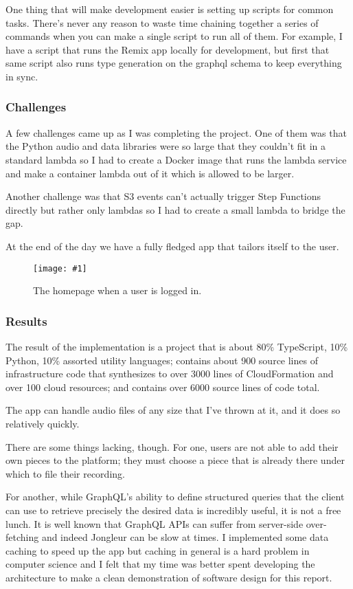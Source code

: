 \documentclass{article}
\newcommand{\screenshot}[2]{
  \begin{figure}[h]
    \texttt{[image: \#1]}
    \caption*{#2}
  \end{figure}
}
\begin{document}
One thing that will make development easier is setting up scripts for common tasks.
There's never any reason to waste time chaining together a series of commands when you can make a single script to run all of them.
For example, I have a script that runs the Remix app locally for development, but first that same script also runs type generation on the graphql schema to keep everything in sync.

\subsubsection{Challenges}

A few challenges came up as I was completing the project.
One of them was that the Python audio and data libraries were so large that they couldn't fit in a standard lambda so I had to create a Docker image that runs the lambda service and make a container lambda out of it which is allowed to be larger.

Another challenge was that S3 events can't actually trigger Step Functions directly but rather only lambdas so I had to create a small lambda to bridge the gap.

At the end of the day we have a fully fledged app that tailors itself to the user.

\screenshot{jong-home-in}{The homepage when a user is logged in.}

\subsubsection{Results}

The result of the implementation is a project that is about 80\% TypeScript, 10\% Python, 10\% assorted utility languages; contains about 900 source lines of infrastructure code that synthesizes to over 3000 lines of CloudFormation and over 100 cloud resources; and contains over 6000 source lines of code total.

The app can handle audio files of any size that I've thrown at it, and it does so relatively quickly.

There are some things lacking, though.
For one, users are not able to add their own pieces to the platform; they must choose a piece that is already there under which to file their recording.

For another, while GraphQL's ability to define structured queries that the client can use to retrieve precisely the desired data is incredibly useful, it is not a free lunch.
It is well known that GraphQL APIs can suffer from server-side over-fetching and indeed Jongleur can be slow at times.
I implemented some data caching to speed up the app but caching in general is a hard problem in computer science and I felt that my time was better spent developing the architecture to make a clean demonstration of software design for this report.
\end{document}
